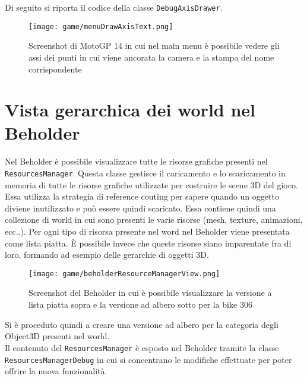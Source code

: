 Di seguito si riporta il codice della classe \texttt{DebugAxisDrawer}.





\begin{figure}[h!] 
	\centering 
	\hspace*{-0.05\columnwidth}\texttt{[image: game/menuDrawAxisText.png]} 
	\caption{Screenshot di MotoGP 14 in cui nel main menu è possibile vedere gli assi dei punti in cui viene ancorata la camera e la stampa del nome corrispondente}
\end{figure}

\section{Vista gerarchica dei world nel Beholder}
	Nel Beholder è possibile visualizzare tutte le risorse grafiche presenti nel \texttt{ResourcesManager}. Questa classe gestisce il caricamento e lo scaricamento in memoria di tutte le risorse grafiche utilizzate per costruire le scene 3D del gioco. Essa utilizza la strategia di reference couting per sapere quando un oggetto diviene inutilizzato e può essere quindi scaricato. Essa contiene quindi una collezione di world in cui sono presenti le varie risorse (mesh, texture, animazioni, ecc..). Per ogni tipo di risorsa presente nel word nel Beholder viene presentata come lista piatta. È possibile invece che queste risorse siano imparentate fra di loro, formando ad esempio delle gerarchie di oggetti 3D.\\
	
	\begin{figure}[h!] 
		\centering 
		\hspace*{-0.05\columnwidth}\texttt{[image: game/beholderResourceManagerView.png]} 
		\caption{Screenshot del Beholder in cui è possibile visualizzare la versione a lista piatta sopra e la versione ad albero sotto per la bike 306}
	\end{figure}
	
	Si è proceduto quindi a creare una versione ad albero per la categoria degli Object3D presenti nel world.\\
	
	Il contenuto del \texttt{ResourcesManager} è esposto nel Beholder tramite la classe \texttt{ResourcesManagerDebug} in cui si concentrano le modifiche effettuate per poter offrire la nuova funzionalità.
	
